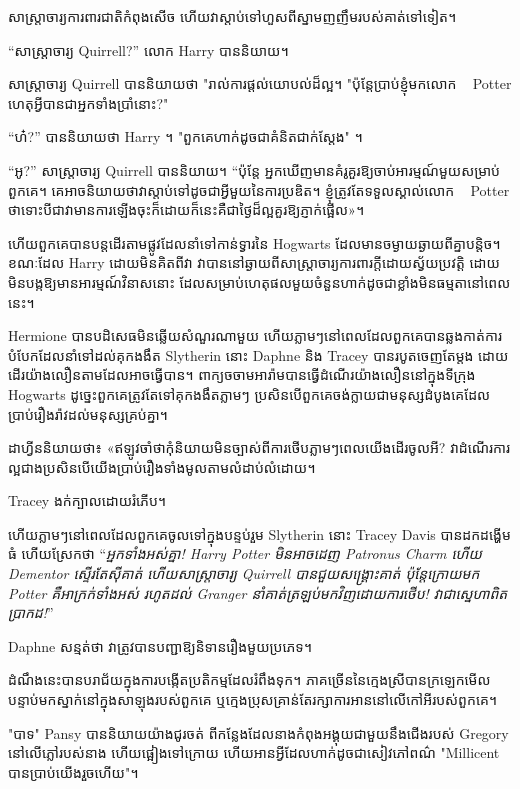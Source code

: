 {សាស្ត្រាចារ្យ​ការពារ​ជាតិ​កំពុង​សើច ហើយ​វា​ស្តាប់​ទៅ​ហួស​ពី​ស្នាម​ញញឹម​របស់​គាត់​ទៅ​ទៀត។

“សាស្រ្តាចារ្យ Quirrell?” លោក Harry បាននិយាយ។

សាស្រ្តាចារ្យ Quirrell បាននិយាយថា "រាល់ការផ្ដល់យោបល់ដ៏ល្អ។ "ប៉ុន្តែប្រាប់ខ្ញុំមកលោក ~ Potter ហេតុអ្វីបានជាអ្នកទាំងប្រាំនោះ?"

“ហ៎?” បាននិយាយថា Harry ។ "ពួកគេហាក់ដូចជាគំនិតជាក់ស្តែង" ។

“អូ?” សាស្ត្រាចារ្យ Quirrell បាននិយាយ។ “ប៉ុន្តែ អ្នកឃើញមានគំរូគួរឱ្យចាប់អារម្មណ៍មួយសម្រាប់ពួកគេ។ គេ​អាច​និយាយ​ថា​វា​ស្តាប់​ទៅ​ដូច​ជា​អ្វី​មួយ​នៃ​ការ​ប្រឌិត។ ខ្ញុំត្រូវតែទទួលស្គាល់លោក ~ Potter ថាទោះបីជាវាមានការឡើងចុះក៏ដោយក៏នេះគឺជាថ្ងៃដ៏ល្អគួរឱ្យភ្ញាក់ផ្អើល»។

ហើយ​ពួកគេ​បាន​បន្ត​ដើរ​តាម​ផ្លូវ​ដែល​នាំ​ទៅ​កាន់​ទ្វារ​នៃ Hogwarts ដែល​មាន​ចម្ងាយ​ឆ្ងាយ​ពី​គ្នា​បន្តិច។ ខណៈដែល Harry ដោយមិនគិតពីវា វាបាននៅឆ្ងាយពីសាស្រ្តាចារ្យការពារក្តីដោយស្វ័យប្រវត្តិ ដោយមិនបង្កឱ្យមានអារម្មណ៍វិនាសនោះ ដែលសម្រាប់ហេតុផលមួយចំនួនហាក់ដូចជាខ្លាំងមិនធម្មតានៅពេលនេះ។


Hermione បានបដិសេធមិនឆ្លើយសំណួរណាមួយ ហើយភ្លាមៗនៅពេលដែលពួកគេបានឆ្លងកាត់ការបំបែកដែលនាំទៅដល់គុកងងឹត Slytherin នោះ Daphne និង Tracey បានរបូតចេញតែម្តង ដោយដើរយ៉ាងលឿនតាមដែលអាចធ្វើបាន។ ពាក្យចចាមអារ៉ាមបានធ្វើដំណើរយ៉ាងលឿននៅក្នុងទីក្រុង Hogwarts ដូច្នេះពួកគេត្រូវតែទៅគុកងងឹតភ្លាមៗ ប្រសិនបើពួកគេចង់ក្លាយជាមនុស្សដំបូងគេដែលប្រាប់រឿងរ៉ាវដល់មនុស្សគ្រប់គ្នា។

ដាហ្វីន​និយាយ​ថា​៖ «​ឥឡូវ​ចាំ​ថា​កុំ​និយាយ​មិន​ច្បាស់​ពី​ការ​ថើប​ភ្លាម​ៗ​ពេល​យើង​ដើរ​ចូល​អី​? វាដំណើរការល្អជាងប្រសិនបើយើងប្រាប់រឿងទាំងមូលតាមលំដាប់លំដោយ។

Tracey ងក់ក្បាលដោយរំភើប។

ហើយភ្លាមៗនៅពេលដែលពួកគេចូលទៅក្នុងបន្ទប់រួម Slytherin នោះ Tracey Davis បានដកដង្ហើមធំ ហើយស្រែកថា “\emph{អ្នកទាំងអស់គ្នា! Harry Potter មិនអាចដេញ Patronus Charm ហើយ Dementor ស្ទើរតែស៊ីគាត់ ហើយសាស្រ្តាចារ្យ Quirrell បានជួយសង្គ្រោះគាត់ ប៉ុន្តែក្រោយមក Potter គឺអាក្រក់ទាំងអស់ រហូតដល់ Granger នាំគាត់ត្រឡប់មកវិញដោយការថើប! វា​ជា​ស្នេហា​ពិត​ប្រាកដ!}”

Daphne សន្មត់ថា វាត្រូវបានបញ្ជាឱ្យនិទានរឿងមួយប្រភេទ។

ដំណឹង​នេះ​បាន​បរាជ័យ​ក្នុង​ការ​បង្កើត​ប្រតិកម្ម​ដែល​រំពឹង​ទុក។ ភាគច្រើននៃក្មេងស្រីបានក្រឡេកមើល បន្ទាប់មកស្នាក់នៅក្នុងសាឡុងរបស់ពួកគេ ឬក្មេងប្រុសគ្រាន់តែរក្សាការអាននៅលើកៅអីរបស់ពួកគេ។

"បាទ" Pansy បាននិយាយយ៉ាងជូរចត់ ពីកន្លែងដែលនាងកំពុងអង្គុយជាមួយនឹងជើងរបស់ Gregory នៅលើភ្លៅរបស់នាង ហើយផ្អៀងទៅក្រោយ ហើយអានអ្វីដែលហាក់ដូចជាសៀវភៅពណ៌ "Millicent បានប្រាប់យើងរួចហើយ"។

}
